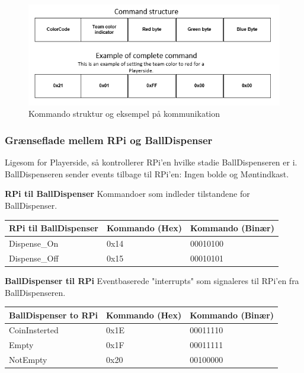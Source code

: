\documentclass[Arkitektur/System_main.tex]{subfiles}
\begin{document}
\begin{figure}[H]
    \centering
    \includegraphics[width=\textwidth]{Arkitektur/Grenseflader/Graphics/teamColor.png}
    \caption{Kommando struktur og eksempel på kommunikation}
    \label{fig:teamColor}
\end{figure}

\subsubsection{Grænseflade mellem RPi og BallDispenser} \label{sec:RPi_BallDispenser_com}
Ligesom for Playerside, så kontrollerer RPi'en hvilke stadie BallDispenseren er i. BallDispenseren sender events tilbage til RPi'en: Ingen bolde og Møntindkast. 

\textbf{RPi til BallDispenser}
Kommandoer som indleder tilstandene for BallDispenser. 

\begin{table}[H]
\centering
\begin{tabular}{|L{0.25\textwidth}|L{0.3\textwidth}|L{0.35\textwidth}|}
\hline
\textbf{RPi til BallDispenser} & \textbf{Kommando (Hex)} & \textbf{Kommando (Binær)} \\ \hline
Dispense\_On & 0x14 & 00010100 \\ \hline
Dispense\_Off & 0x15 & 00010101 \\ \hline
\end{tabular}
\end{table}

\textbf{BallDispenser til RPi}
Eventbaserede "interrupts" som signaleres til RPi'en fra BallDispenseren. 
\begin{table}[H]
\begin{tabular}{|L{0.25\textwidth}|L{0.3\textwidth}|L{0.35\textwidth}|}
\hline
\textbf{BallDispenser to RPi} & \textbf{Kommando (Hex)} & \textbf{Kommando (Binær)} \\ \hline
CoinInsterted & 0x1E & 00011110 \\ \hline
Empty & 0x1F & 00011111 \\ \hline
NotEmpty & 0x20 & 00100000 \\ \hline
\end{tabular}%
\end{table}
\end{document}
